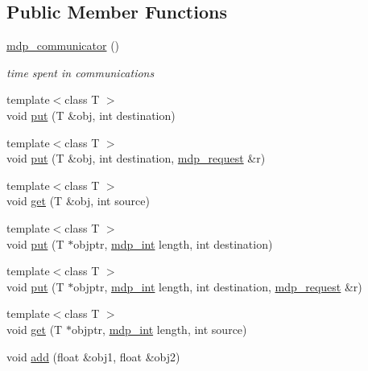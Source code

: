 \subsection*{Public Member Functions}
\begin{DoxyCompactItemize}
\item 
\hyperlink{classmdp__communicator_a9c38d613d17973364b3121d8e8b03301}{mdp\_\-communicator} ()
\begin{DoxyCompactList}\small\item\em time spent in communications \item\end{DoxyCompactList}\item 
{\footnotesize template$<$class T $>$ }\\void \hyperlink{classmdp__communicator_a2508725493731958b8f1f29509055d4f}{put} (T \&obj, int destination)
\item 
{\footnotesize template$<$class T $>$ }\\void \hyperlink{classmdp__communicator_ae684429614dd4d06cead7fb9ea241ff0}{put} (T \&obj, int destination, \hyperlink{mdp__communicator_8h_ad8cbf5bc85a849902c39cd29d3f9a8f1}{mdp\_\-request} \&r)
\item 
{\footnotesize template$<$class T $>$ }\\void \hyperlink{classmdp__communicator_aeb5d6d81591246daa1014e53025a6960}{get} (T \&obj, int source)
\item 
{\footnotesize template$<$class T $>$ }\\void \hyperlink{classmdp__communicator_a14a43410b3c704b9f01f698f8e77349e}{put} (T $\ast$objptr, \hyperlink{mdp__global__vars_8h_aaa1ad9d0dcd2124aa5af0120d9954174}{mdp\_\-int} length, int destination)
\item 
{\footnotesize template$<$class T $>$ }\\void \hyperlink{classmdp__communicator_a44cbcb7d57c5e01d6526e749b9640d68}{put} (T $\ast$objptr, \hyperlink{mdp__global__vars_8h_aaa1ad9d0dcd2124aa5af0120d9954174}{mdp\_\-int} length, int destination, \hyperlink{mdp__communicator_8h_ad8cbf5bc85a849902c39cd29d3f9a8f1}{mdp\_\-request} \&r)
\item 
{\footnotesize template$<$class T $>$ }\\void \hyperlink{classmdp__communicator_acfdb1f6ffcbbd80840edec86726b4877}{get} (T $\ast$objptr, \hyperlink{mdp__global__vars_8h_aaa1ad9d0dcd2124aa5af0120d9954174}{mdp\_\-int} length, int source)
\item 
void \hyperlink{classmdp__communicator_a59576e470c0eb7c0b5faa177cc90c54b}{add} (float \&obj1, float \&obj2)

\end{DoxyCompactItemize}
